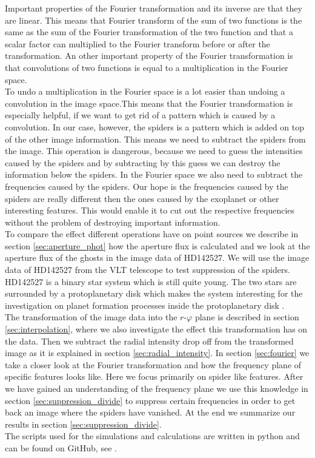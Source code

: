 Important properties of the Fourier transformation and its inverse are that they are linear. This means that Fourier transform of the sum of two functions is the same as the sum of the Fourier transformation of the two function and that a scalar factor can multiplied to the Fourier transform before or after the transformation. An other important property of the Fourier transformation is that convolutions of two functions is equal to a multiplication in the Fourier space. \\
To undo a multiplication in the Fourier space is a lot easier than undoing a convolution in the image space.This means that the Fourier transformation is especially helpful, if we want to get rid of a pattern which is caused by a convolution. In our case, however, the spiders is a pattern which is added on top of the other image information. This means we need to subtract the spiders from the image. This operation is dangerous, because we need to guess the intensities caused by the spiders and by subtracting by this guess we can destroy the information below the spiders. In the Fourier space we also need to subtract the frequencies caused by the spiders. Our hope is the frequencies caused by the spiders are really different then the ones caused by the exoplanet or other interesting features. This would enable it to cut out the respective frequencies without the problem of destroying important information.\\
To compare the effect different operations have on point sources we describe in section \ref{sec:aperture_phot} how the aperture flux is calculated and we look at the aperture flux of the ghosts in the image data of HD142527. We will use the image data of HD142527 from the VLT telescope to test suppression of the spiders. HD142527 is a binary star system which is still quite young. The two stars are surrounded by a protoplanetary disk which makes the system interesting for the investigation on planet formation processes inside the protoplanetary disk \cite{HD142527}.\\
The transformation of the image data into the $r$-$\varphi$ plane is described in section \ref{sec:interpolation}, where we also investigate the effect this transformation has on the data. Then we subtract the radial intensity drop off from the transformed image as it is explained in section \ref{sec:radial_intensity}. In section \ref{sec:fourier} we take a closer look at the Fourier transformation and how the frequency plane of specific features looks like. Here we focus primarily on spider like features. After we have gained an understanding of the frequency plane we use this knowledge in section \ref{sec:suppression_divide} to suppress certain frequencies in order to get back an image where the spiders have vanished. At the end we summarize our results in section \ref{sec:suppression_divide}.\\
The scripts used for the simulations and calculations are written in python and can be found 
on GitHub, see \cite{github}.
